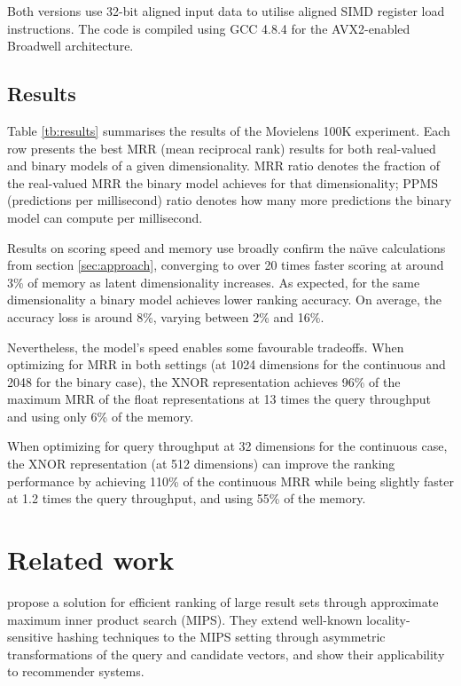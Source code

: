 \documentclass[sigchi]{acmart}
\begin{document}
Both versions use 32-bit aligned input data to utilise aligned SIMD register load instructions. The code is compiled using GCC 4.8.4 for the AVX2-enabled Broadwell architecture.

\subsection{Results}
\label{sec:results}
Table \ref{tb:results} summarises the results of the Movielens 100K experiment. Each row presents the best MRR (mean reciprocal rank) results for both real-valued and binary models of a given dimensionality. MRR ratio denotes the fraction of the real-valued MRR the binary model achieves for that dimensionality; PPMS (predictions per millisecond) ratio denotes how many more predictions the binary model can compute per millisecond.

Results on scoring speed and memory use broadly confirm the na{\"\i}ve calculations from section \ref{sec:approach}, converging to over 20 times faster scoring at around 3\% of memory as latent dimensionality increases.
As expected, for the same dimensionality a binary model achieves lower ranking accuracy. On average, the accuracy loss is around 8\%, varying between 2\% and 16\%.

Nevertheless, the model's speed enables some favourable tradeoffs. When optimizing for MRR in both settings (at 1024 dimensions for the continuous and 2048 for the binary case), the XNOR representation achieves 96\% of the maximum MRR of the float representations at 13 times the query throughput and using only 6\% of the memory.

When optimizing for query throughput at 32 dimensions for the continuous case, the XNOR representation (at 512 dimensions) can improve the ranking performance by achieving 110\% of the continuous MRR while being slightly faster at 1.2 times the query throughput, and using 55\% of the memory.

\section{Related work}
\citet{shrivastava2014asymmetric} propose a solution for efficient ranking of large result sets through approximate maximum inner product search (MIPS). They extend well-known \citep{indyk1998approximate} locality-sensitive hashing techniques to the MIPS setting through asymmetric transformations of the query and candidate vectors, and show their applicability to recommender systems.
\end{document}
